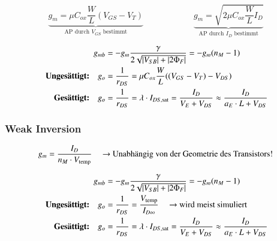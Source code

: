 \vspace{-0.3cm}

\[
    \underbrace{ g_m = \mu C_{ox} \frac{W}{L} (V_{GS} - V_T) }_{\text{AP durch } V_{GS} \text{ bestimmt}} \qquad \qquad \qquad
    \underbrace{ g_m = \sqrt{2 \mu C_{ox} \frac{W}{L} I_D} }_{\text{AP durch } I_D \text{ bestimmt}} 
\]


\vspace{-0.15cm}

\begin{align*}
                                         g_{mb} &= -g_m \frac{\gamma}{2 \sqrt{\left|V_{SB}\right| + \left|2 \Phi_F\right|}} = - g_m (n_M - 1)                                     \\
    \text{ \textbf{Ungesättigt:}} \quad     g_o &= \frac{1}{r_{DS}} = \mu C_{ox} \frac{W}{L} ((V_{GS} - V_T) - V_{DS})                                              \\
    \text{ \textbf{Gesättigt:}} \quad       g_o &=  \frac{1}{r_{DS}} = \lambda \cdot I_{DS, \rm sat} = \frac{I_D}{V_E + V_{DS}} \approx \frac{I_D}{a_E \cdot L + V_{DS}}
\end{align*}


\subsubsection{Weak Inversion}

\vspace{-0.3cm}

\[
    g_m = \frac{I_D}{n_M \cdot V_\text{temp}} \quad \text{ \textrightarrow\ Unabhängig von der Geometrie des Transistors!}
\]


\vspace{-0.15cm}

\begin{align*}
                                         g_{mb} &= -g_m \frac{\gamma}{2 \sqrt{\abs{V_{SB}} + \abs{2 \Phi_F}}} = - g_m (n_M - 1)                                             \\
    \text{ \textbf{Ungesättigt:}} \quad     g_o &= \frac{1}{r_{DS}} = \frac{V_{\text{temp}}}{I_{D \infty}} \quad \text{ \textrightarrow\ wird meist simuliert}              \\
    \text{ \textbf{Gesättigt:}} \quad       g_o &=  \frac{1}{r_{DS}} = \lambda \cdot  I_{DS, \rm sat} = \frac{I_D}{V_E + V_{DS}}  \approx \frac{I_D}{a_E \cdot L + V_{DS}}
\end{align*}


